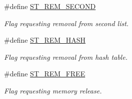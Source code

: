\begin{CompactItemize}
\#define \hyperlink{group__dbprim__smat_ga67}{ST\_\-REM\_\-SECOND}
\begin{CompactList}\small\item\em Flag requesting removal from second list. \item\end{CompactList}\item 
\#define \hyperlink{group__dbprim__smat_ga68}{ST\_\-REM\_\-HASH}
\begin{CompactList}\small\item\em Flag requesting removal from hash table. \item\end{CompactList}\item 
\#define \hyperlink{group__dbprim__smat_ga69}{ST\_\-REM\_\-FREE}
\begin{CompactList}\small\item\em Flag requesting memory release. \item\end{CompactList}\end{CompactItemize}
